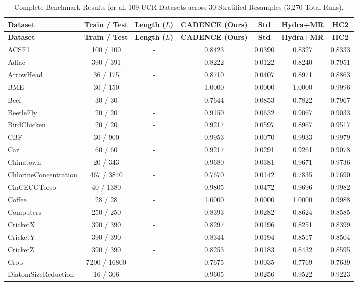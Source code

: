 \begin{longtable}{lcccccc}
\caption{Complete Benchmark Results for all 109 UCR Datasets across 30 Stratified Resamples (3,270 Total Runs).}\\ 
\toprule
\textbf{Dataset} & \textbf{Train / Test} & \textbf{Length ($L$)} & \textbf{CADENCE (Ours)} & \textbf{Std} & \textbf{Hydra+MR} & \textbf{HC2} \\ 
\midrule
\endfirsthead
\toprule
\textbf{Dataset} & \textbf{Train / Test} & \textbf{Length ($L$)} & \textbf{CADENCE (Ours)} & \textbf{Std} & \textbf{Hydra+MR} & \textbf{HC2} \\ 
\midrule
\endhead
\bottomrule
\endfoot
ACSF1 & 100 / 100 & - & 0.8423 & 0.0390 & 0.8327 & 0.8333 \\
Adiac & 390 / 391 & - & 0.8222 & 0.0122 & 0.8240 & 0.7951 \\
ArrowHead & 36 / 175 & - & 0.8710 & 0.0407 & 0.8971 & 0.8863 \\
BME & 30 / 150 & - & 1.0000 & 0.0000 & 1.0000 & 0.9996 \\
Beef & 30 / 30 & - & 0.7644 & 0.0853 & 0.7822 & 0.7967 \\
BeetleFly & 20 / 20 & - & 0.9150 & 0.0632 & 0.9067 & 0.9033 \\
BirdChicken & 20 / 20 & - & 0.9217 & 0.0597 & 0.8967 & 0.9517 \\
CBF & 30 / 900 & - & 0.9953 & 0.0070 & 0.9933 & 0.9979 \\
Car & 60 / 60 & - & 0.9217 & 0.0291 & 0.9261 & 0.9078 \\
Chinatown & 20 / 343 & - & 0.9680 & 0.0381 & 0.9671 & 0.9736 \\
ChlorineConcentration & 467 / 3840 & - & 0.7670 & 0.0142 & 0.7835 & 0.7690 \\
CinCECGTorso & 40 / 1380 & - & 0.9805 & 0.0472 & 0.9696 & 0.9982 \\
Coffee & 28 / 28 & - & 1.0000 & 0.0000 & 1.0000 & 0.9988 \\
Computers & 250 / 250 & - & 0.8393 & 0.0282 & 0.8624 & 0.8585 \\
CricketX & 390 / 390 & - & 0.8297 & 0.0196 & 0.8251 & 0.8399 \\
CricketY & 390 / 390 & - & 0.8344 & 0.0194 & 0.8517 & 0.8504 \\
CricketZ & 390 / 390 & - & 0.8253 & 0.0183 & 0.8432 & 0.8595 \\
Crop & 7200 / 16800 & - & 0.7675 & 0.0035 & 0.7769 & 0.7639 \\
DiatomSizeReduction & 16 / 306 & - & 0.9605 & 0.0256 & 0.9522 & 0.9223 \\

\end{longtable}
